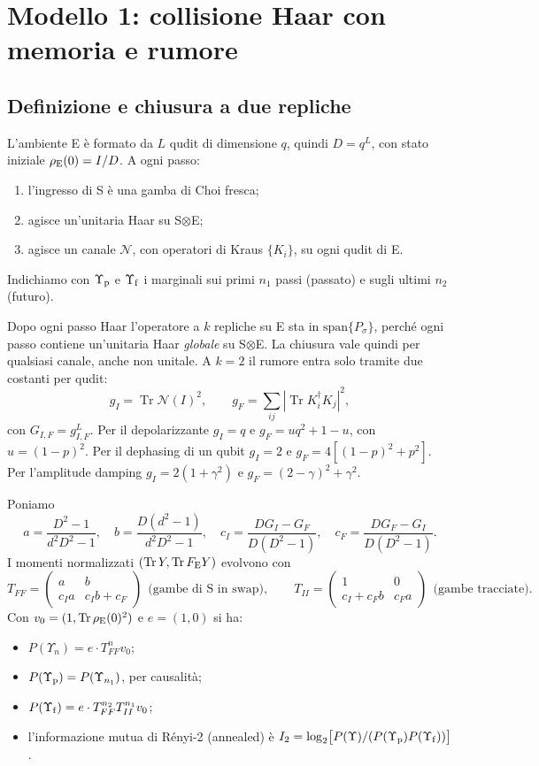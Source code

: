 \section{Modello 1: collisione Haar con memoria e rumore}\label{sec:model1}

\CartoonModelOne
\subsection{Definizione e chiusura a due repliche}
L'ambiente E è formato da $L$ qudit di dimensione $q$, quindi $D=q^L$, con stato iniziale $\rho_{\rm E}(0)=I/D$. A ogni passo:
\begin{enumerate}[leftmargin=2em]
\item l'ingresso di S è una gamba di Choi fresca;
\item agisce un'unitaria Haar su S$\otimes$E;
\item agisce un canale $\mathcal N$, con operatori di Kraus $\{K_i\}$, su ogni qudit di E.
\end{enumerate}
Indichiamo con $\Upsilon_{\rm p}$ e $\Upsilon_{\rm f}$ i marginali sui primi $n_1$ passi (passato) e sugli ultimi $n_2$ (futuro).

Dopo ogni passo Haar l'operatore a $k$ repliche su E sta in $\mathrm{span}\{P_\sigma\}$, perché ogni passo contiene un'unitaria Haar \emph{globale} su S$\otimes$E. La chiusura vale quindi per qualsiasi canale, anche non unitale. A $k=2$ il rumore entra solo tramite due costanti per qudit:
\[
g_I=\operatorname{Tr}\mathcal N(I)^2,\qquad g_F=\sum_{ij}|\operatorname{Tr}K_i^\dagger K_j|^2,
\]
con $G_{I,F}=g_{I,F}^L$. Per il depolarizzante $g_I=q$ e $g_F=uq^2+1-u$, con $u=(1-p)^2$. Per il dephasing di un qubit $g_I=2$ e $g_F=4[(1-p)^2+p^2]$. Per l'amplitude damping $g_I=2(1+\gamma^2)$ e $g_F=(2-\gamma)^2+\gamma^2$.

Poniamo
\[
a=\frac{D^2-1}{d^2D^2-1},\quad b=\frac{D(d^2-1)}{d^2D^2-1},\quad c_I=\frac{DG_I-G_F}{D(D^2-1)},\quad c_F=\frac{DG_F-G_I}{D(D^2-1)}.
\]
I momenti normalizzati $(\operatorname{Tr}Y,\operatorname{Tr}F_{\rm E}Y)$ evolvono con
\[
T_{FF}=\begin{pmatrix}a&b\\ c_Ia&c_Ib+c_F\end{pmatrix}\ \ \text{(gambe di S in swap)},\qquad
T_{II}=\begin{pmatrix}1&0\\ c_I+c_Fb&c_Fa\end{pmatrix}\ \ \text{(gambe tracciate)}.
\]
Con $v_0=(1,\operatorname{Tr}\rho_{\rm E}(0)^2)$ e $e=(1,0)$ si ha:
\begin{itemize}[leftmargin=1.5em]
\item $P(\Upsilon_n)=e\cdot T_{FF}^n v_0$;
\item $P(\Upsilon_{\rm p})=P(\Upsilon_{n_1})$, per causalità;
\item $P(\Upsilon_{\rm f})=e\cdot T_{FF}^{n_2}T_{II}^{n_1}v_0$;
\item l'informazione mutua di Rényi-2 (annealed) è $I_2=\log_2\bigl[P(\Upsilon)/(P(\Upsilon_{\rm p})P(\Upsilon_{\rm f}))\bigr]$.
\end{itemize}

